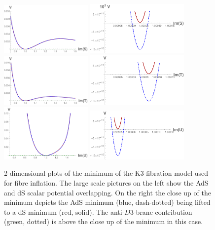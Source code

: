 \documentclass[a4paper,12pt,twoside,openright]{report}
\begin{document}
\begin{figure}[H]
     \centering
     \includegraphics[width=0.4\textwidth]{fibreSLarge.pdf} \hspace{20pt} \includegraphics[width=0.45\textwidth]{fibreSClose.pdf}\\
     \includegraphics[width=0.4\textwidth]{fibreTLarge.pdf} \hspace{20pt} \includegraphics[width=0.45\textwidth]{fibreTClose.pdf}\\
     \includegraphics[width=0.4\textwidth]{fibreULarge.pdf} \hspace{20pt} \includegraphics[width=0.45\textwidth]{fibreUClose.pdf}
\caption{2-dimensional plots of the minimum of the K3-fibration model used for fibre inflation. The large scale pictures on the left show the AdS and dS scalar potential overlapping. On the right the close up of the minimum depicts the AdS minimum (blue, dash-dotted) being lifted to a dS minimum (red, solid). The anti-$D3$-brane contribution (green, dotted) is above the close up of the minimum in this case. }
\label{fig:fibre2d}
\end{figure}
\end{document}
